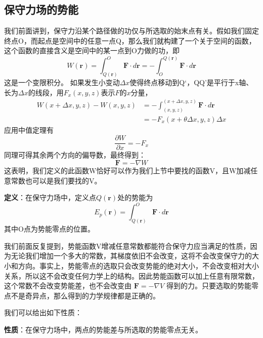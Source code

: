 \subsection{保守力场的势能}
我们前面讲到，保守力沿某个路径做的功仅与所选取的始末点有关。假如我们固定终点O，而起点是空间中的任意一点Q，那么我们就构建了一个关于空间的函数，这个函数的直接含义是空间中的某一点到O力做的功，即
\[
    W(\textbf{r}) = \int_{Q(\textbf{r})}^{O}  \mathbf{F}\cdot d\mathbf{r} = -  \int_{O}^{Q(\textbf{r})}  \mathbf{F}\cdot d\mathbf{r}
\]
这是一个变限积分。
如果发生小变动$\Delta x$使得终点移动到Q‘，QQ'是平行于x轴、长为$\Delta x$的线段，用$F_x (x,y,z)$表示$F$的$x$分量，
\[
    \begin{aligned}
        W(x+\Delta x,y,z) - W(x,y,z) & = -  \int_{(x,y,z)}^{(x+\Delta x,y,z)}  \mathbf{F}\cdot d\mathbf{r} \\&= -  F_x (x+\theta \Delta x,y,z) \Delta x
    \end{aligned}
\]
应用中值定理有
\[
    \frac{\partial W}{\partial x} = - F_x
\]
同理可得其余两个方向的偏导数，最终得到：
\[
    \mathbf{F}=-\nabla W
\]
这表明，我们定义的此函数W恰好可以作为我们上节中要找的函数V，且W加减任意常数也可以是我们要找的V。
\begin{tcolorbox}[colback=white!5!white,colframe=green!50!black,title=保守力场势能的定义]
    \textbf{定义}：在保守力场中，定义点$Q(\textbf{r})$处的势能为
    \[
        E_p(\textbf{r}) = \int_{Q(\textbf{r})}^{O}  \mathbf{F}\cdot d\mathbf{r}
    \]
    其中O点为势能零点的位置。
\end{tcolorbox}

我们前面反复提到，势能函数V增减任意常数都能符合保守力应当满足的性质，因为无论我们增加一个多大的常数，其梯度依旧不会改变，这将不会改变保守力的大小和方向。事实上，势能零点的选取只会改变势能的绝对大小，不会改变相对大小关系，所以这不会改变任何力学上的结构。因此势能函数可以加上任意有限常数，这个常数不会改变势能差，也不会改变由 $\mathbf F=-\nabla V$ 得到的力。只要选取的势能零点不是奇异点，那么得到的力学规律都是正确的。

我们可以给出如下性质：
\begin{tcolorbox}[colback=white!5!white,colframe=green!50!black,title=保守力场中的势能差]
    \textbf{性质}：在保守力场中，两点的势能差与所选取的势能零点无关。
\end{tcolorbox}

